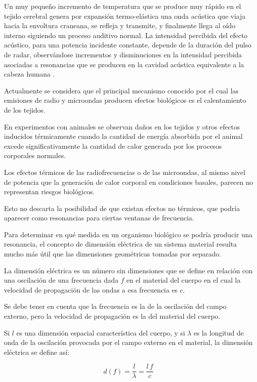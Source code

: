 Un muy pequeño incremento de temperatura que se produce muy rápido en el tejido cerebral genera por expansión termo-elástica una onda acústica que viaja hacia la envoltura craneana, se refleja y transmite, y finalmente llega al oído interno siguiendo un proceso auditivo normal.
La intensidad percibida del efecto acústico, para una potencia incidente constante, depende de la duración del pulso de radar, observándose incrementos y disminuciones en la intensidad percibida asociadas a resonancias que se producen en la cavidad acústica equivalente a la cabeza humana \citep{Reilly_1998}.

Actualmente se considera que el principal mecanismo conocido por el cual las emisiones de radio y microondas producen efectos biológicos es el calentamiento de los tejidos.

En experimentos con animales se observan daños en los tejidos y otros efectos inducidos térmicamente cuando la cantidad de energía absorbida por el animal excede significativamente la cantidad de calor generada por los procesos corporales normales.

Los efectos térmicos de las radiofrecuencias o de las microondas, al mismo nivel de potencia que la generación de calor corporal en condiciones basales, parecen no representan riesgos biológicos.

Esto no descarta la posibilidad de que existan efectos no térmicos, que podría aparecer como resonancias para ciertas ventanas de frecuencia.

Para determinar en qué medida en un organismo biológico se podría producir una resonancia, el concepto de dimensión eléctrica de un sistema material resulta mucho más útil que las dimensiones geométricas tomadas por separado.

La dimensión eléctrica es un número sin dimensiones que se define en relación con una oscilación de una frecuencia dada $f$ en el material del cuerpo en el cual la velocidad de propagación de las ondas a esa frecuencia es $c$.

Se debe tener en cuenta que la frecuencia es la de la oscilación del campo externo, pero la velocidad de propagación es la del material del cuerpo.

Si $l$ es una dimensión espacial característica del cuerpo, y si $\lambda$ es la longitud de onda de la oscilación provocada por el campo externo en el material, la dimensión eléctrica se define así:

\begin{equation}
	d(f)=\dfrac{l}{\lambda}=\dfrac{l\, f}{c}
\end{equation}

